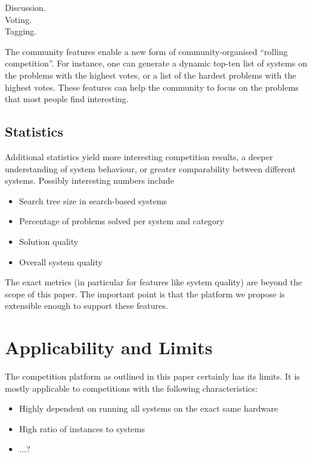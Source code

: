 \begin{description}
  \item[Discussion.]
  \item[Voting.]
  \item[Tagging.]
\end{description}

The community features enable a new form of community-organised ``rolling competition''. For instance, one can generate a dynamic top-ten list of systems on the problems with the highest votes, or a list of the hardest problems with the highest votes. These features can help the community to focus on the problems that most people find interesting.

\subsection{Statistics}

Additional statistics yield more interesting competition results, a deeper understanding of system behaviour, or greater comparability between different systems. Possibly interesting numbers include
\begin{itemize}
  \item Search tree size in search-based systems
  \item Percentage of problems solved per system and category
  \item Solution quality
  \item Overall system quality
\end{itemize}

The exact metrics (in particular for features like system quality) are beyond the scope of this paper. The important point is that the platform we propose is extensible enough to support these features.

\section{Applicability and Limits}
\label{sec:limits}

The competition platform as outlined in this paper certainly has its limits. It is mostly applicable to competitions with the following characteristics:
\begin{itemize}
  \item Highly dependent on running all systems on the exact same hardware
  \item High ratio of instances to systems
  \item ...?
\end{itemize}

